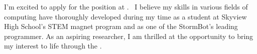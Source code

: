 



I'm excited to apply for the \position\;position at \company.
\areaofinterest\,
I believe my skills in various fields of computing have thoroughly
developed during my time as a student at Skyview High School's
STEM magnet program and as one of the StormBot's leading programmer.
As an aspiring researcher, 
I am thrilled at the opportunity 
to bring my interest to life through the \company.